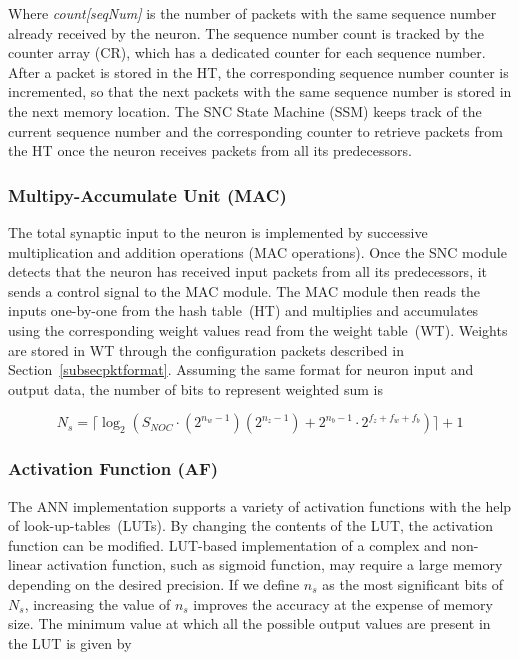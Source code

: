 Where \emph{count[seqNum]} is the number of packets with the same sequence number already received by the neuron.
The sequence number count is tracked by the counter array (CR), which has a dedicated counter for each sequence number. 
After a packet is stored in the HT, the corresponding sequence number counter is incremented, so that the next packets with the same sequence number is stored in the next memory location. 
The SNC State Machine (SSM) keeps track of the current sequence number and the corresponding counter to retrieve packets from the HT once the neuron receives packets from all its predecessors. 

\subsubsection{\bf Multipy-Accumulate Unit (MAC)}
The total synaptic input to the neuron is implemented by successive multiplication and addition operations (MAC operations).
Once the SNC module detects that the neuron has received input packets from all its predecessors, it sends a control signal to the MAC module.
The MAC module then reads the inputs one-by-one from the hash table~(HT) and multiplies and accumulates using the corresponding weight values read from the weight table~(WT). 
Weights are stored in WT through the configuration packets described in Section~\ref{subsecpktformat}. 
Assuming the same format for neuron input and output data, the number of bits to represent weighted sum is

\begin{equation}
N_{s}=\lceil\log_{2}(S_{NOC}\cdot (2^{n_{w}-1})(2^{n_{z}-1})+2^{n_{b}-1}\cdot 2^{f_{z}+f_{w}+f_{b}})\rceil+1
\label{equation:Ns}
\end{equation}

\subsubsection{\bf Activation Function (AF)}
The ANN implementation supports a variety of activation functions with the help of look-up-tables~(LUTs).
By changing the contents of the LUT, the activation function can be modified.
LUT-based implementation of a complex and non-linear activation function, such as sigmoid function, may require a large memory depending on the desired precision.  
If we define $n_{s}$ as the most significant bits of $N_{s}$, increasing the value of $n_{s}$ improves the accuracy at the expense of memory size. 
The minimum value at which all the possible output values are present in the LUT is given by

